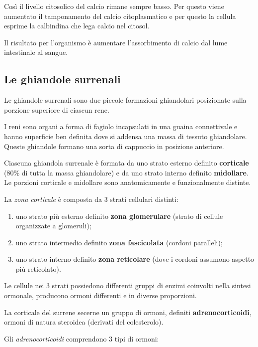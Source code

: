 \documentclass[]{article}
\begin{document}
Così il livello citosolico del calcio rimane sempre basso. Per questo
viene aumentato il tamponamento del calcio citoplasmatico e per questo
la cellula esprime la calbindina che lega calcio nel citosol.

Il risultato per l'organismo è aumentare l'assorbimento di calcio dal
lume intestinale al sangue.

\subsection{Le ghiandole surrenali}\label{le-ghiandole-surrenali}

Le ghiandole surrenali sono due piccole formazioni ghiandolari
posizionate sulla porzione superiore di ciascun rene.

I reni sono organi a forma di fagiolo incapsulati in una guaina
connettivale e hanno superficie ben definita dove si addensa una massa
di tessuto ghiandolare. Queste ghiandole formano una sorta di cappuccio
in posizione anteriore.

Ciascuna ghiandola surrenale è formata da uno strato esterno definito
\textbf{corticale} (80\% di tutta la massa ghiandolare) e da uno strato
interno definito \textbf{midollare}. Le porzioni corticale e midollare
sono anatomicamente e funzionalmente distinte.

La \emph{zona corticale} è composta da 3 strati cellulari distinti:

\begin{enumerate}
\def\labelenumi{\arabic{enumi}.}
\itemsep1pt\parskip0pt
\item
  uno strato più esterno definito \textbf{zona glomerulare} (strato di
  cellule organizzate a glomeruli);
\item
  uno strato intermedio definito \textbf{zona fascicolata} (cordoni
  paralleli);
\item
  uno strato interno definito \textbf{zona reticolare} (dove i cordoni
  assumono aspetto più reticolato).
\end{enumerate}

Le cellule nei 3 strati possiedono differenti gruppi di enzimi coinvolti
nella sintesi ormonale, producono ormoni differenti e in diverse
proporzioni.

La corticale del surrene secerne un gruppo di ormoni, definiti
\textbf{adrenocorticoidi}, ormoni di natura steroidea (derivati del
colesterolo).

Gli \emph{adrenocorticoidi} comprendono 3 tipi di ormoni:
\end{document}
